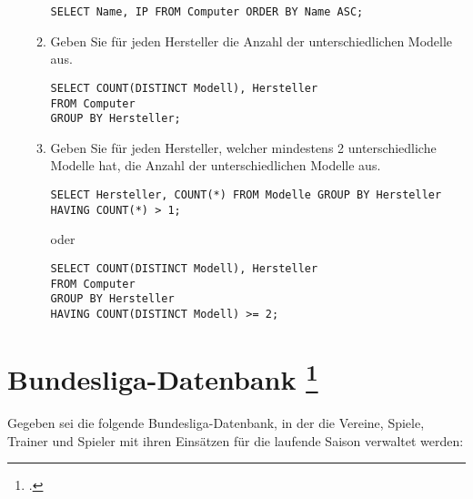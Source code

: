 \documentclass{lehramt-informatik}
\begin{document}
\begin{enumerate}
\begin{enumerate}
\begin{antwort}
\begin{verbatim}
SELECT Name, IP FROM Computer ORDER BY Name ASC;
\end{verbatim}
\end{antwort}


\item Geben Sie für jeden Hersteller die Anzahl der unterschiedlichen
Modelle aus.

\begin{antwort}
\begin{verbatim}
SELECT COUNT(DISTINCT Modell), Hersteller
FROM Computer
GROUP BY Hersteller;
\end{verbatim}
\end{antwort}


\item Geben Sie für jeden Hersteller, welcher mindestens 2
unterschiedliche Modelle hat, die Anzahl der unterschiedlichen Modelle
aus.

\begin{antwort}
\begin{verbatim}
SELECT Hersteller, COUNT(*) FROM Modelle GROUP BY Hersteller HAVING COUNT(*) > 1;
\end{verbatim}
\end{antwort}

oder

\begin{antwort}
\begin{verbatim}
SELECT COUNT(DISTINCT Modell), Hersteller
FROM Computer
GROUP BY Hersteller
HAVING COUNT(DISTINCT Modell) >= 2;
\end{verbatim}
\end{antwort}
\end{enumerate}
\end{enumerate}

%

\section{Bundesliga-Datenbank
\footcite[Aufgabe 4: Relationale Algebra und SQL]{db:ab:7}}

Gegeben sei die folgende Bundesliga-Datenbank, in der die Vereine,
Spiele, Trainer und Spieler mit ihren Einsätzen für die laufende Saison
verwaltet werden:
\end{document}
